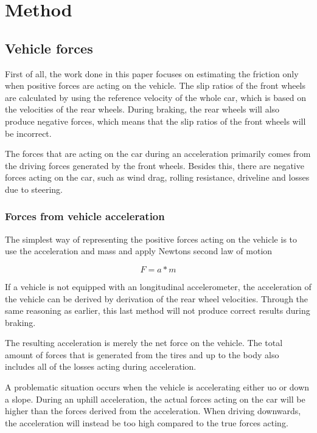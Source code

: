 \chapter{Method}

\section{Vehicle forces}

First of all, the work done in this paper focuses on estimating the friction only when positive forces are acting on the vehicle. The slip ratios of the front wheels are calculated by using the reference velocity of the whole car, which is based on the velocities of the rear wheels. During braking, the rear wheels will also produce negative forces, which means that the slip ratios of the front wheels will be incorrect. 

The forces that are acting on the car during an acceleration primarily comes from the driving forces generated by the front wheels. Besides this, there are negative forces acting on the car, such as wind drag, rolling resistance, driveline and losses due to steering. 

\subsection{Forces from vehicle acceleration}

The simplest way of representing the positive forces acting on the vehicle is to use the acceleration and mass and apply Newtons second law of motion

\begin{equation}
	F = a*m
\end{equation}

If a vehicle is not equipped with an longitudinal accelerometer, the acceleration of the vehicle can be derived by derivation of the rear wheel velocities. Through the same reasoning as earlier, this last method will not produce correct results during braking. 

The resulting acceleration is merely the net force on the vehicle. The total amount of forces that is generated from the tires and up to the body also includes all of the losses acting during acceleration. 

A problematic situation occurs when the vehicle is accelerating either uo or down a slope. During an uphill acceleration, the actual forces acting on the car will be higher than the forces derived from the acceleration. When driving downwards, the acceleration will instead be too high compared to the true forces acting. 

